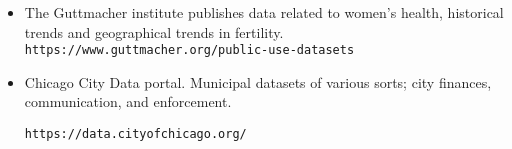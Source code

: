 \documentclass[]{book}
\theoremstyle{definition}
\newtheorem*{soln}{Solution}
\begin{document}
\begin{enumerate}
\begin{itemize}
\item The Guttmacher institute publishes data related to women's health,  historical trends and geographical trends in fertility.
\texttt{https://www.guttmacher.org/public-use-datasets}



\item Chicago City Data portal.  Municipal datasets of various sorts; city finances, communication, and enforcement.

\texttt{https://data.cityofchicago.org/}

\end{itemize}


\end{enumerate}
\end{document}
